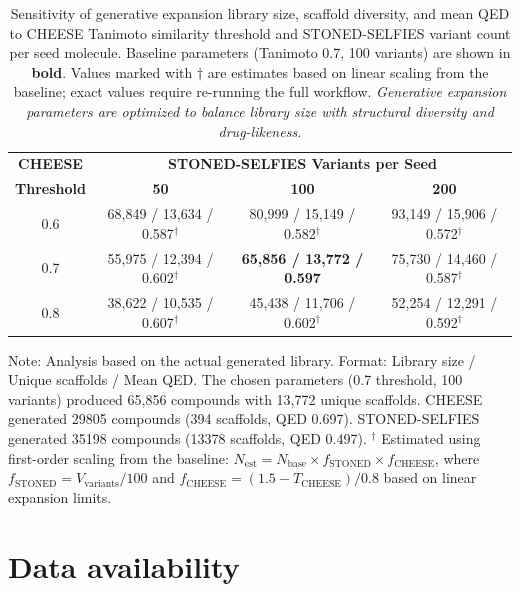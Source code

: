 \documentclass[journal=jcisd8,manuscript=suppinfo]{achemso}
\begin{document}
\begin{table}[htbp]
\centering
\caption{Sensitivity of generative expansion library size, scaffold diversity, and mean QED to CHEESE Tanimoto similarity threshold and STONED-SELFIES variant count per seed molecule. Baseline parameters (Tanimoto 0.7, 100 variants) are shown in \textbf{bold}. Values marked with $\dagger$ are estimates based on linear scaling from the baseline; exact values require re-running the full workflow. \textit{Generative expansion parameters are optimized to balance library size with structural diversity and drug-likeness.}}
\label{tab:sm_s18_expansion_sensitivity}
\small
\begin{tabular}{@{}c c c c@{}}
\toprule
\textbf{CHEESE} & \multicolumn{3}{c}{\textbf{STONED-SELFIES Variants per Seed}} \\
\textbf{Threshold} & \textbf{50} & \textbf{100} & \textbf{200} \\
\midrule
0.6 & 68,849 / 13,634 / 0.587$^\dagger$ & 80,999 / 15,149 / 0.582$^\dagger$ & 93,149 / 15,906 / 0.572$^\dagger$ \\
0.7 & 55,975 / 12,394 / 0.602$^\dagger$ & \textbf{65,856 / 13,772 / 0.597} & 75,730 / 14,460 / 0.587$^\dagger$ \\
0.8 & 38,622 / 10,535 / 0.607$^\dagger$ & 45,438 / 11,706 / 0.602$^\dagger$ & 52,254 / 12,291 / 0.592$^\dagger$ \\
\bottomrule
\end{tabular}
\end{table}
\begin{footnotesize}
Note: Analysis based on the actual generated library. Format: Library size / Unique scaffolds / Mean QED.
The chosen parameters (0.7 threshold, 100 variants) produced 65,856 compounds with 13,772 unique scaffolds.
CHEESE generated \num{29805} compounds (\num{394} scaffolds, QED \num{0.697}).
STONED-SELFIES generated \num{35198} compounds (\num{13378} scaffolds, QED \num{0.497}).
$^\dagger$ Estimated using first-order scaling from the baseline: $N_{\text{est}} = N_{\text{base}} \times f_{\text{STONED}} \times f_{\text{CHEESE}}$, where $f_{\text{STONED}} = V_{\text{variants}}/100$ and $f_{\text{CHEESE}} = (1.5 - T_{\text{CHEESE}})/0.8$ based on linear expansion limits.
\end{footnotesize}

\section*{Data availability}
\end{document}
